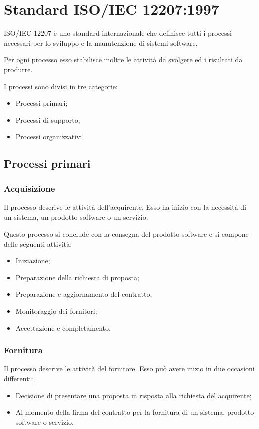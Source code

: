 \chapter{Standard ISO/IEC 12207:1997}\label{appendice-iso}
ISO/IEC 12207 è uno standard internazionale che definisce tutti i processi necessari per lo sviluppo e la manutenzione di sistemi software.

Per ogni processo esso stabilisce inoltre le attività da svolgere ed i risultati da produrre.

I processi sono divisi in tre categorie:
\begin{itemize}
    \item Processi primari;
    \item Processi di supporto;
    \item Processi organizzativi.
\end{itemize}

\section{Processi primari}

\subsection{Acquisizione}
Il processo descrive le attività dell'acquirente. Esso ha inizio con la necessità di un sistema, un prodotto software o un servizio.

Questo processo si conclude con la consegna del prodotto software e si compone delle seguenti attività:
\begin{itemize}
    \item Iniziazione;
    \item Preparazione della richiesta di proposta;
    \item Preparazione e aggiornamento del contratto;
    \item Monitoraggio dei fornitori;
    \item Accettazione e completamento.
\end{itemize}

\subsection{Fornitura}

Il processo descrive le attività del fornitore. Esso può avere inizio in due occasioni differenti:

\begin{itemize}
    \item Decisione di presentare una proposta in risposta alla richiesta del acquirente;
    \item Al momento della firma del contratto per la fornitura di un sistema, prodotto software o servizio.
\end{itemize}

